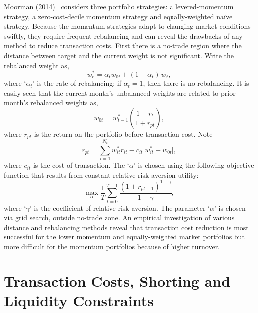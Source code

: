 Moorman (2014)~\cite{moorman} considers three portfolio strategies: a levered-momentum strategy, a zero-cost-decile momentum strategy and equally-weighted na\"ive strategy. Because the momentum strategies adapt to changing market conditions swiftly, they require frequent rebalancing and can reveal the drawbacks of any method to reduce transaction costs. First there is a no-trade region where the distance between target and the current weight is not significant. Write the rebalanced weight as,
	\begin{equation} \label{eqn:rebalanceweight}
	w_t^*= \alpha_t w_{0t} + (1 - \alpha_t)\, w_t,
	\end{equation}
where `$\alpha_t$' is the rate of rebalancing; if $\alpha_t=1$, then there is no rebalancing. It is easily seen that the current month's unbalanced weights are related to prior month's rebalanced weights as,
	\begin{equation} \label{eqn:priorrebalanced}
	w_{0t}= w_{t-1}^* \left( \dfrac{1-r_t}{1+r_{pt}} \right),
	\end{equation}
where $r_{pt}$ is the return on the portfolio before-transaction cost. Note
	\begin{equation}\label{eqn:transnote}
	r_{pt}= \sum_{i=1}^{N_t} w_{it}^* r_{it} - c_{it} \lvert w_{it}^* - w_{0t} \rvert,
	\end{equation}
where $c_{it}$ is the cost of transaction. The `$\alpha$' is chosen using the following objective function that results from constant relative risk aversion utility:
	\begin{equation}\label{eqn:objectivefun}
	\max_\alpha \dfrac{1}{T} \sum_{t=0}^{T-1} \dfrac{(1 + r_{pt+1})^{1-\gamma}}{1-\gamma},
	\end{equation}
where `$\gamma$' is the coefficient of relative risk-aversion. The parameter `$\alpha$' is chosen via grid search, outside no-trade zone. An empirical investigation of various distance and rebalancing methods reveal that transaction cost reduction is most successful for the lower momentum and equally-weighted market portfolios but more difficult for the momentum portfolios because of higher turnover. 



\section{Transaction Costs, Shorting and Liquidity Constraints}


